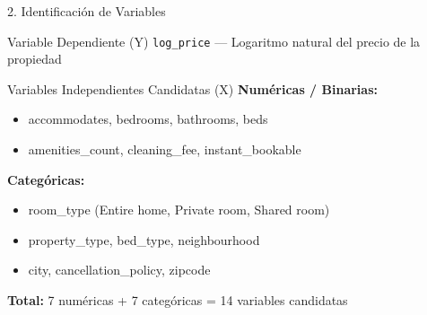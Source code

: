\documentclass{beamer}
\begin{document}
\begin{frame}{2. Identificación de Variables}
  
  \begin{block}{Variable Dependiente (Y)}
    \texttt{log\_price} — Logaritmo natural del precio de la propiedad
  \end{block}
  
  \vspace{0.3cm}
  
  \begin{block}{Variables Independientes Candidatas (X)}
    \textbf{Numéricas / Binarias:}
    \begin{itemize}
      \item accommodates, bedrooms, bathrooms, beds
      \item amenities\_count, cleaning\_fee, instant\_bookable
    \end{itemize}
    
    \textbf{Categóricas:}
    \begin{itemize}
      \item room\_type (Entire home, Private room, Shared room)
      \item property\_type, bed\_type, neighbourhood
      \item city, cancellation\_policy, zipcode
    \end{itemize}
  \end{block}
  
  \vspace{0.2cm}
  
  \begin{center}
    \textbf{Total:} 7 numéricas + 7 categóricas = 14 variables candidatas
  \end{center}
\end{frame}
\end{document}
